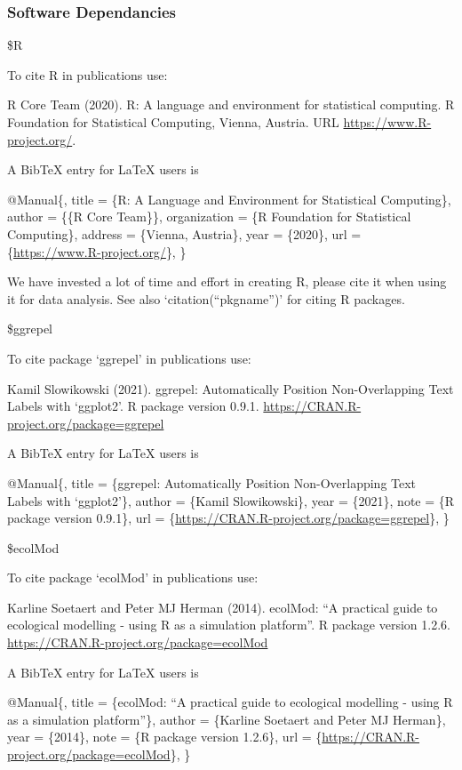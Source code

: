 \documentclass[
]{article}
\begin{document}
\hypertarget{software-dependancies}{%
\subsubsection{Software Dependancies}\label{software-dependancies}}

\$R

To cite R in publications use:

R Core Team (2020). R: A language and environment for statistical
computing. R Foundation for Statistical Computing, Vienna, Austria. URL
\url{https://www.R-project.org/}.

A BibTeX entry for LaTeX users is

@Manual\{, title = \{R: A Language and Environment for Statistical
Computing\}, author = \{\{R Core Team\}\}, organization = \{R Foundation
for Statistical Computing\}, address = \{Vienna, Austria\}, year =
\{2020\}, url = \{\url{https://www.R-project.org/}\}, \}

We have invested a lot of time and effort in creating R, please cite it
when using it for data analysis. See also `citation(``pkgname'')' for
citing R packages.

\$ggrepel

To cite package `ggrepel' in publications use:

Kamil Slowikowski (2021). ggrepel: Automatically Position
Non-Overlapping Text Labels with `ggplot2'. R package version 0.9.1.
\url{https://CRAN.R-project.org/package=ggrepel}

A BibTeX entry for LaTeX users is

@Manual\{, title = \{ggrepel: Automatically Position Non-Overlapping
Text Labels with `ggplot2'\}, author = \{Kamil Slowikowski\}, year =
\{2021\}, note = \{R package version 0.9.1\}, url =
\{\url{https://CRAN.R-project.org/package=ggrepel}\}, \}

\$ecolMod

To cite package `ecolMod' in publications use:

Karline Soetaert and Peter MJ Herman (2014). ecolMod: ``A practical
guide to ecological modelling - using R as a simulation platform''. R
package version 1.2.6. \url{https://CRAN.R-project.org/package=ecolMod}

A BibTeX entry for LaTeX users is

@Manual\{, title = \{ecolMod: ``A practical guide to ecological
modelling - using R as a simulation platform''\}, author = \{Karline
Soetaert and Peter MJ Herman\}, year = \{2014\}, note = \{R package
version 1.2.6\}, url =
\{\url{https://CRAN.R-project.org/package=ecolMod}\}, \}
\end{document}
